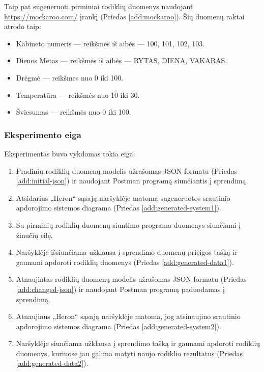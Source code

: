 \documentclass{VUMIFPSbakalaurinis}
\begin{document}
\noindent Taip pat sugeneruoti pirminiai rodiklių duomenys naudojant \url{https://mockaroo.com/} įrankį (Priedas \ref{add:mockaroo}). Šių duomenų raktai atrodo taip:
\begin{itemize}
    \item Kabineto numeris — reikšmės iš aibės — 100, 101, 102, 103.
    \item Dienos Metas — reikšmės iš aibės — RYTAS, DIENA, VAKARAS.
    \item Drėgmė — reikšmes nuo 0 iki 100.
    \item Temperatūra — reikšmės nuo 10 iki 30.
    \item Šviesumas — reikšmės nuo 0 iki 100.
\end{itemize}

\subsubsection{Eksperimento eiga}

Eksperimentas buvo vykdomas tokia eiga:
\begin{enumerate}
    \item Pradinių rodiklių duomenų modelis užrašomas JSON formatu (Priedas \ref{add:initial-json}) ir naudojant Postman programą siunčiantis į sprendimą.
    \item Atsidarius „Heron“ sąsają naršyklėje matoma sugeneruotos srautinio apdorojimo sistemos diagrama (Priedas \ref{add:generated-system1}).
    \item Su pirminių rodiklių duomenų siuntimo programa duomenys siunčiami į žinučių eilę.
    \item Naršyklėje išsiunčiama užklausa į sprendimo duomenų prieigos tašką ir gaunami apdoroti rodiklių duomenys (Priedas \ref{add:generated-data1}).
    \item Atnaujintas rodiklių duomenų modelis užrašomas JSON formatu (Priedas \ref{add:changed-json}) ir naudojant Postman programą paduodamas į sprendimą.
    \item Atnaujinus „Heron“ sąsają naršyklėje matoma, jog atsinaujino srautinio apdorojimo sistemos diagrama (Priedas \ref{add:generated-system2}).
    \item Naršyklėje siunčiama užklausa į sprendimo tašką ir gaunami apdoroti rodiklių duomenys, kuriuose jau galima matyti naujo rodiklio rezultatus (Priedas \ref{add:generated-data2}).
\end{enumerate}
\end{document}
